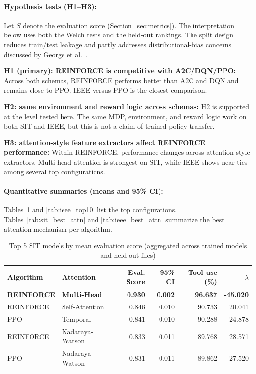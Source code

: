 \documentclass[sn-basic]{sn-jnl}%
\begin{document}
\paragraph{Hypothesis tests (H1--H3):}
Let $S$ denote the evaluation score (Section~\ref{sec:metrics}). The interpretation below uses both the Welch tests and the held-out rankings. The split design reduces train/test leakage and partly addresses distributional-bias concerns discussed by George et al.~\cite{George2025Evaluation}.

\textbf{H1 (primary): \textsc{REINFORCE} is competitive with A2C/DQN/PPO:}
Across both schemas, \textsc{REINFORCE} performs better than \textsc{A2C} and \textsc{DQN} and remains close to \textsc{PPO}. IEEE versus \textsc{PPO} is the closest comparison.

\textbf{H2: same environment and reward logic across schemas:}
H2 is supported at the level tested here. The same MDP, environment, and reward logic work on both SIT and IEEE, but this is not a claim of trained-policy transfer.

\textbf{H3: attention-style feature extractors affect \textsc{REINFORCE} performance:}
Within \textsc{REINFORCE}, performance changes across attention-style extractors. Multi-head attention is strongest on SIT, while IEEE shows near-ties among several top configurations.

\paragraph{Quantitative summaries (means and 95\% CI):}
Tables~\ref{tab:sit_top10} and \ref{tab:ieee_top10} list the top configurations. Tables~\ref{tab:sit_best_attn} and \ref{tab:ieee_best_attn} summarize the best attention mechanism per algorithm.

\begin{table}[htbp]
\caption{Top 5 SIT models by mean evaluation score (aggregated across trained models and held-out files)}
\label{tab:sit_top10}
\begin{tabular}{ll r r r r}
\toprule
\textbf{Algorithm} & \textbf{Attention} & \textbf{Eval. Score} & \textbf{95\% CI} & \textbf{Tool use (\%)} & \textbf{$\lambda$}\\
\midrule
    \textbf{REINFORCE} & \textbf{Multi-Head} & \textbf{0.930} & \textbf{0.002} & \textbf{96.637} & \textbf{-45.020} \\
    REINFORCE & Self-Attention & 0.846 & 0.010 & 90.733 & 20.041 \\
    PPO & Temporal & 0.841 & 0.010 & 90.288 & 24.878 \\
    REINFORCE & Nadaraya-Watson & 0.833 & 0.011 & 89.768 & 28.571 \\
    PPO & Nadaraya-Watson & 0.831 & 0.011 & 89.862 & 27.520 \\
    \bottomrule
\end{tabular}
\end{table}
\end{document}
